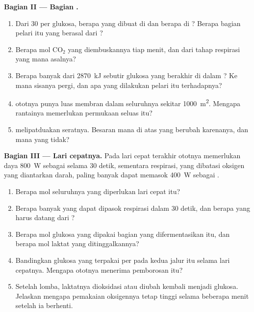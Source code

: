 \begin{problem}
\medskip
\noindent\textbf{Bagian II --- Bagian .}
\begin{enumerate}[resume]
  \item Dari 30  per glukosa, berapa yang dibuat di  dan
        berapa di ? Berapa bagian  pelari itu yang
        berasal dari ?
  \item Berapa mol $\mathrm{CO_2}$ yang diembuskannya tiap menit, dan
        dari tahap respirasi yang mana asalnya?
  \item Berapa banyak dari \qty{2870}{kJ} sebutir glukosa yang berakhir
        di dalam ? Ke mana sisanya pergi, dan apa yang dilakukan
        pelari itu terhadapnya?
  \item {} ototnya punya luas membran dalam seluruhnya
        sekitar \qty{1000}{m^2}. Mengapa rantainya memerlukan permukaan
        seluas itu?
  \item {} melipatduakan  seratnya. Besaran mana di
        atas yang berubah karenanya, dan mana yang tidak?
\end{enumerate}

\medskip
\noindent\textbf{Bagian III --- Lari cepatnya.}
Pada lari cepat terakhir ototnya memerlukan daya \qty{800}{W} sebagai
 selama 30 detik, sementara respirasi, yang dibatasi oksigen yang
diantarkan darah, paling banyak dapat memasok \qty{400}{W} sebagai .
\begin{enumerate}[resume]
  \item Berapa mol  seluruhnya yang diperlukan lari cepat itu?
  \item Berapa banyak yang dapat dipasok respirasi dalam 30 detik, dan
        berapa yang harus datang dari ?
  \item Berapa mol glukosa yang dipakai bagian yang difermentasikan
        itu, dan berapa mol laktat yang ditinggalkannya?
  \item Bandingkan glukosa yang terpakai per  pada kedua jalur itu
        selama lari cepatnya. Mengapa ototnya menerima pemborosan itu?
  \item Setelah lomba, laktatnya dioksidasi atau diubah kembali
        menjadi glukosa. Jelaskan mengapa pemakaian oksigennya tetap
        tinggi selama beberapa menit setelah ia berhenti.
\end{enumerate}


\end{problem}
